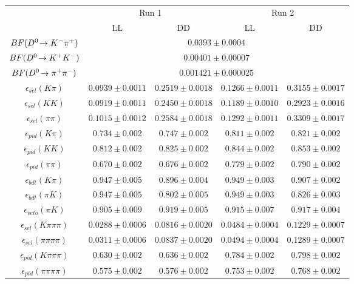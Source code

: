 \begin{table}
\centering
\begin{tabular}{c|cc|cc}
\hline
& \multicolumn{2}{c}{Run 1} & \multicolumn{2}{c}{Run 2} \\
& LL & DD & LL & DD \\
\hline
$BF({{D}^0}\!\rightarrow {\ensuremath{{K}^-}}{\ensuremath{{\pi}^+}})$ & \multicolumn{4}{c}{$0.0393 \pm 0.0004$} \\
$BF({{D}^0}\!\rightarrow {\ensuremath{{K}^+}}{\ensuremath{{K}^-}})$ & \multicolumn{4}{c}{$0.00401 \pm 0.00007$} \\
$BF({{D}^0}\!\rightarrow {\ensuremath{{\pi}^+}}{\ensuremath{{\pi}^-}})$ & \multicolumn{4}{c}{$0.001421 \pm 0.000025$} \\
$\epsilon_{sel}(K\pi)$ & $0.0939 \pm 0.0011$ & $0.2519 \pm 0.0018$ & $0.1266 \pm 0.0011$ & $0.3155 \pm 0.0017$ \\
$\epsilon_{sel}(KK)$ & $0.0919 \pm 0.0011$ & $0.2450 \pm 0.0018$ & $0.1189 \pm 0.0010$ & $0.2923 \pm 0.0016$ \\
$\epsilon_{sel}(\pi\pi)$ & $0.1015 \pm 0.0012$ & $0.2584 \pm 0.0018$ & $0.1292 \pm 0.0011$ & $0.3309 \pm 0.0017$ \\
$\epsilon_{pid}(K\pi)$ & $0.734 \pm 0.002$ & $0.747 \pm 0.002$ & $0.811 \pm 0.002$ & $0.821 \pm 0.002$ \\
$\epsilon_{pid}(KK)$ & $0.812 \pm 0.002$ & $0.825 \pm 0.002$ & $0.844 \pm 0.002$ & $0.853 \pm 0.002$ \\
$\epsilon_{pid}(\pi\pi)$ & $0.670 \pm 0.002$ & $0.676 \pm 0.002$ & $0.779 \pm 0.002$ & $0.790 \pm 0.002$ \\
$\epsilon_{bdt}(K\pi)$ & $0.947 \pm 0.005$ & $0.896 \pm 0.004$ & $0.949 \pm 0.003$ & $0.907 \pm 0.002$ \\
$\epsilon_{bdt}(\pi K)$ & $0.947 \pm 0.005$ & $0.802 \pm 0.005$ & $0.949 \pm 0.003$ & $0.826 \pm 0.003$ \\
$\epsilon_{veto}(\pi K)$ & $0.905 \pm 0.009$ & $0.919 \pm 0.005$ & $0.915 \pm 0.007$ & $0.917 \pm 0.004$ \\
$\epsilon_{sel}(K\pi\pi\pi)$ & $0.0288 \pm 0.0006$ & $0.0816 \pm 0.0020$ & $0.0484 \pm 0.0004$ & $0.1229 \pm 0.0007$ \\
$\epsilon_{sel}(\pi\pi\pi\pi)$ & $0.0311 \pm 0.0006$ & $0.0837 \pm 0.0020$ & $0.0494 \pm 0.0004$ & $0.1289 \pm 0.0007$ \\
$\epsilon_{pid}(K\pi\pi\pi)$ & $0.630 \pm 0.002$ & $0.636 \pm 0.002$ & $0.784 \pm 0.002$ & $0.798 \pm 0.002$ \\
$\epsilon_{pid}(\pi\pi\pi\pi)$ & $0.575 \pm 0.002$ & $0.576 \pm 0.002$ & $0.753 \pm 0.002$ & $0.768 \pm 0.002$ \\

\end{tabular}
\end{table}
